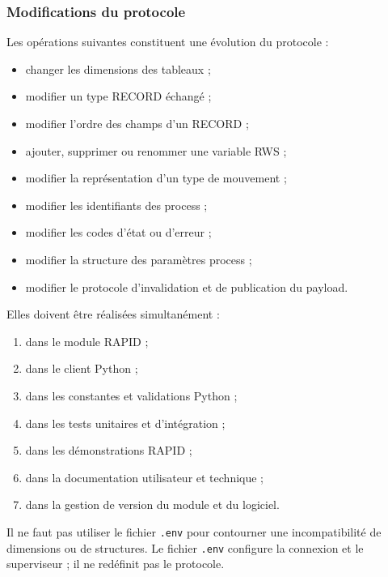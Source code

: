 \documentclass{rapportENSAM}
\begin{document}
\subsubsection{Modifications du protocole}
\label{subsubsec:rapid-protocol-changes}

Les opérations suivantes constituent une évolution du protocole :

\begin{itemize}
    \item changer les dimensions des tableaux ;
    \item modifier un type RECORD échangé ;
    \item modifier l'ordre des champs d'un RECORD ;
    \item ajouter, supprimer ou renommer une variable RWS ;
    \item modifier la représentation d'un type de mouvement ;
    \item modifier les identifiants des process ;
    \item modifier les codes d'état ou d'erreur ;
    \item modifier la structure des paramètres process ;
    \item modifier le protocole d'invalidation et de publication du payload.
\end{itemize}

Elles doivent être réalisées simultanément :

\begin{enumerate}
    \item dans le module RAPID ;
    \item dans le client Python ;
    \item dans les constantes et validations Python ;
    \item dans les tests unitaires et d'intégration ;
    \item dans les démonstrations RAPID ;
    \item dans la documentation utilisateur et technique ;
    \item dans la gestion de version du module et du logiciel.
\end{enumerate}

Il ne faut pas utiliser le fichier \texttt{.env} pour contourner une
incompatibilité de dimensions ou de structures. Le fichier
\texttt{.env} configure la connexion et le superviseur ; il ne redéfinit pas
le protocole.

\FloatBarrier
\end{document}
